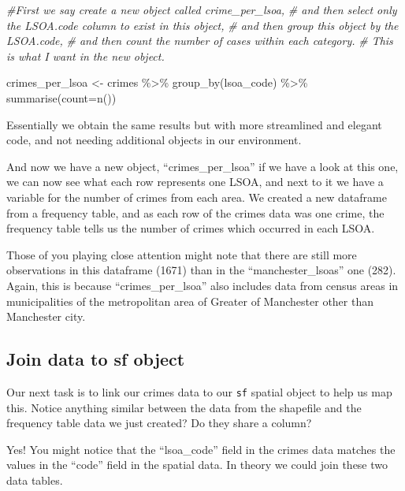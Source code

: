 \documentclass[
  krantz2]{krantz}
\makeatletter
\newenvironment{Shaded}{\begin{snugshade}}{\end{snugshade}}
\newcommand{\AttributeTok}[1]{\textcolor[rgb]{0.61,0.61,0.61}{#1}}
\newcommand{\CommentTok}[1]{\textcolor[rgb]{0.37,0.37,0.37}{\textit{#1}}}
\newcommand{\FunctionTok}[1]{\textcolor[rgb]{0,0,0}{#1}}
\newcommand{\NormalTok}[1]{#1}
\newcommand{\OtherTok}[1]{\textcolor[rgb]{0.37,0.37,0.37}{#1}}
\newcommand{\SpecialCharTok}[1]{\textcolor[rgb]{0,0,0}{#1}}
\newenvironment{kframe}{%
\medskip{}
\setlength{\fboxsep}{.8em}
 \def\at@end@of@kframe{}%
 \ifinner\ifhmode%
  \def\at@end@of@kframe{\end{minipage}}%
  \begin{minipage}{\columnwidth}%
 \fi\fi%
 \def\FrameCommand##1{\hskip\@totalleftmargin \hskip-\fboxsep
 \colorbox{shadecolor}{##1}\hskip-\fboxsep
     \hskip-\linewidth \hskip-\@totalleftmargin \hskip\columnwidth}%
 \MakeFramed {\advance\hsize-\width
   \@totalleftmargin\z@ \linewidth\hsize
   \@setminipage}}%
 {\par\unskip\endMakeFramed%
 \at@end@of@kframe}
\renewenvironment{Shaded}{\begin{kframe}}{\end{kframe}}
\makeatother
\begin{document}
\begin{Shaded}
\begin{Highlighting}[]
\CommentTok{\#First we say create a new object called crime\_per\_lsoa, }
\CommentTok{\# and then select only the LSOA.code column to exist in this object, }
\CommentTok{\# and then group this object by the LSOA.code, }
\CommentTok{\# and then count the number of cases within each category. }
\CommentTok{\# This is what I want in the new object.}

\NormalTok{crimes\_per\_lsoa }\OtherTok{\textless{}{-}}\NormalTok{ crimes }\SpecialCharTok{\%\textgreater{}\%}
  \FunctionTok{group\_by}\NormalTok{(lsoa\_code) }\SpecialCharTok{\%\textgreater{}\%}
  \FunctionTok{summarise}\NormalTok{(}\AttributeTok{count=}\FunctionTok{n}\NormalTok{())}
\end{Highlighting}
\end{Shaded}

Essentially we obtain the same results but with more streamlined and elegant code, and not needing additional objects in our environment.

And now we have a new object, ``crimes\_per\_lsoa'' if we have a look at this one, we can now see what each row represents one LSOA, and next to it we have a variable for the number of crimes from each area. We created a new dataframe from a frequency table, and as each row of the crimes data was one crime, the frequency table tells us the number of crimes which occurred in each LSOA.

Those of you playing close attention might note that there are still more observations in this dataframe (1671) than in the ``manchester\_lsoas'' one (282). Again, this is because ``crimes\_per\_lsoa'' also includes data from census areas in municipalities of the metropolitan area of Greater of Manchester other than Manchester city.

\hypertarget{join-data-to-sf-object}{%
\subsection{Join data to sf object}\label{join-data-to-sf-object}}

Our next task is to link our crimes data to our \texttt{sf} spatial object to help us map this. Notice anything similar between the data from the shapefile and the frequency table data we just created? Do they share a column?

Yes! You might notice that the ``lsoa\_code'' field in the crimes data matches the values in the ``code'' field in the spatial data. In theory we could join these two data tables.
\end{document}
